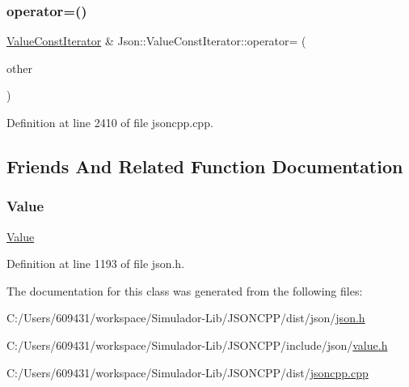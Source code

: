 \hypertarget{class_json_1_1_value_const_iterator_ad1b1c11f8d7fb22d4d3c231915f2b15b}{}\label{class_json_1_1_value_const_iterator_ad1b1c11f8d7fb22d4d3c231915f2b15b} 
\subsubsection{\texorpdfstring{operator=()}{operator=()}\hspace{0.1cm}{\footnotesize\ttfamily [2/2]}}
{\footnotesize\ttfamily \hyperlink{class_json_1_1_value_const_iterator}{Value\+Const\+Iterator} \& Json\+::\+Value\+Const\+Iterator\+::operator= (\begin{DoxyParamCaption}\item[{const \hyperlink{class_json_1_1_value_iterator_base}{Value\+Iterator\+Base} \&}]{other }\end{DoxyParamCaption})}



Definition at line 2410 of file jsoncpp.\+cpp.



\subsection{Friends And Related Function Documentation}
\hypertarget{class_json_1_1_value_const_iterator_a896c037a32087c5c20d97e64a1786880}{}\label{class_json_1_1_value_const_iterator_a896c037a32087c5c20d97e64a1786880} 
\subsubsection{\texorpdfstring{Value}{Value}}
{\footnotesize\ttfamily \hyperlink{class_json_1_1_value}{Value}\hspace{0.3cm}{\ttfamily [friend]}}



Definition at line 1193 of file json.\+h.



The documentation for this class was generated from the following files\+:\begin{DoxyCompactItemize}
\item 
C\+:/\+Users/609431/workspace/\+Simulador-\/\+Lib/\+J\+S\+O\+N\+C\+P\+P/dist/json/\hyperlink{dist_2json_2json_8h}{json.\+h}\item 
C\+:/\+Users/609431/workspace/\+Simulador-\/\+Lib/\+J\+S\+O\+N\+C\+P\+P/include/json/\hyperlink{value_8h}{value.\+h}\item 
C\+:/\+Users/609431/workspace/\+Simulador-\/\+Lib/\+J\+S\+O\+N\+C\+P\+P/dist/\hyperlink{jsoncpp_8cpp}{jsoncpp.\+cpp}\end{DoxyCompactItemize}
